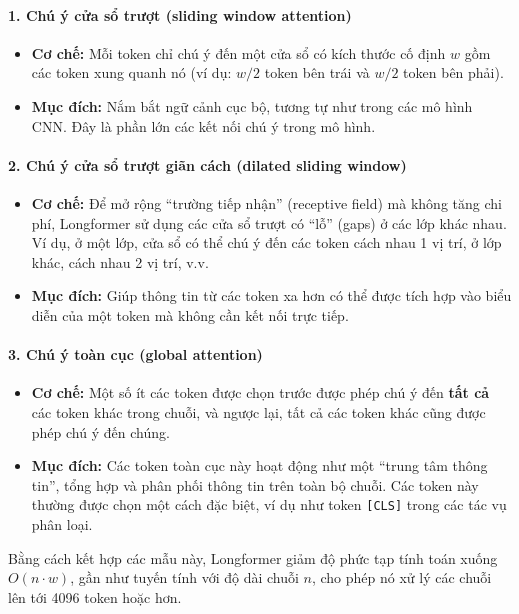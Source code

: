\paragraph{1. Chú ý cửa sổ trượt (sliding window attention)}
\begin{itemize}
    \item \textbf{Cơ chế:} Mỗi token chỉ chú ý đến một cửa sổ có kích thước cố định $w$ gồm các token xung quanh nó (ví dụ: $w/2$ token bên trái và $w/2$ token bên phải).
    \item \textbf{Mục đích:} Nắm bắt ngữ cảnh cục bộ, tương tự như trong các mô hình CNN. Đây là phần lớn các kết nối chú ý trong mô hình.
\end{itemize}

\paragraph{2. Chú ý cửa sổ trượt giãn cách (dilated sliding window)}
\begin{itemize}
    \item \textbf{Cơ chế:} Để mở rộng “trường tiếp nhận” (receptive field) mà không tăng chi phí, Longformer sử dụng các cửa sổ trượt có “lỗ” (gaps) ở các lớp khác nhau. Ví dụ, ở một lớp, cửa sổ có thể chú ý đến các token cách nhau 1 vị trí, ở lớp khác, cách nhau 2 vị trí, v.v.
    \item \textbf{Mục đích:} Giúp thông tin từ các token xa hơn có thể được tích hợp vào biểu diễn của một token mà không cần kết nối trực tiếp.
\end{itemize}

\paragraph{3. Chú ý toàn cục (global attention)}
\begin{itemize}
    \item \textbf{Cơ chế:} Một số ít các token được chọn trước được phép chú ý đến \textbf{tất cả} các token khác trong chuỗi, và ngược lại, tất cả các token khác cũng được phép chú ý đến chúng.
    \item \textbf{Mục đích:} Các token toàn cục này hoạt động như một “trung tâm thông tin”, tổng hợp và phân phối thông tin trên toàn bộ chuỗi. Các token này thường được chọn một cách đặc biệt, ví dụ như token \texttt{[CLS]} trong các tác vụ phân loại.
\end{itemize}

Bằng cách kết hợp các mẫu này, Longformer giảm độ phức tạp tính toán xuống $O(n \cdot w)$, gần như tuyến tính với độ dài chuỗi $n$, cho phép nó xử lý các chuỗi lên tới 4096 token hoặc hơn.

